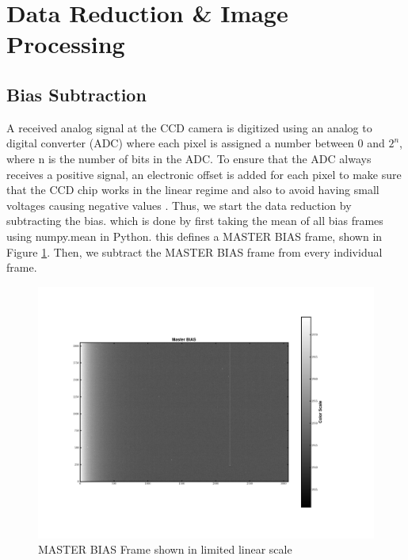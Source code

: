 \documentclass[12pt]{article}
\begin{document}
\section{Data Reduction \& Image Processing}

\subsection{Bias Subtraction}
A received analog signal at the CCD camera is digitized using an analog to digital converter (ADC) where each pixel is assigned a number between 0 and $2^{n}$, where n is the number of bits in the ADC. To ensure that the ADC always receives a positive signal, an electronic offset is added for each pixel to make sure that the CCD chip works in the linear regime and also to avoid having small voltages causing negative values \cite{lecturenote}. Thus, we start the data reduction by subtracting the bias. which is done by first taking the mean of all bias frames using numpy.mean in Python. this defines a MASTER BIAS frame, shown in Figure \ref{fig1}. Then, we subtract the MASTER BIAS frame from every individual frame.  

\begin{figure}[H]
    \centering
    \includegraphics[width=\textwidth]{fig/Master_BIAS.png}
    
    \caption{MASTER BIAS Frame shown in limited linear scale}
    \label{fig1}
    \end{figure}
    
\end{document}

